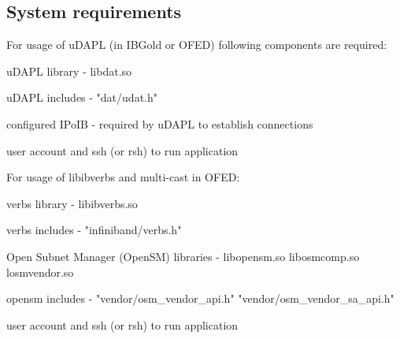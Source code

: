 \subsection{System requirements}

For usage of uDAPL (in IBGold or OFED) following components are required:
\begin{compactitem}[$\bullet$]
\item uDAPL library - libdat.so
\item uDAPL includes - "dat/udat.h"
\item configured IPoIB - required by uDAPL to establish connections
\item user account and ssh (or rsh) to run application
\end{compactitem}

For usage of libibverbs and multi-cast in OFED:
\begin{compactitem}[$\bullet$]
\item verbs library - libibverbs.so
\item verbs includes - "infiniband/verbs.h"
\item Open Subnet Manager (OpenSM) libraries - libopensm.so libosmcomp.so losmvendor.so
\item opensm includes - "vendor/osm\_vendor\_api.h" "vendor/osm\_vendor\_sa\_api.h"
\item user account and ssh (or rsh) to run application
\end{compactitem}
